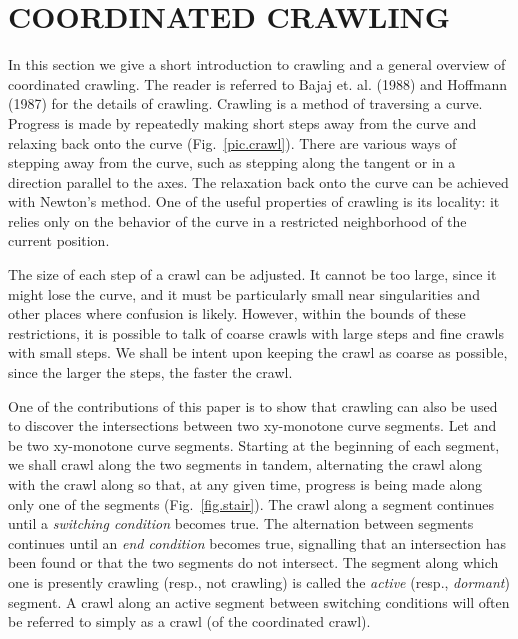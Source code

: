 \section{COORDINATED CRAWLING}
\label{sec-coor}

In this section we give a short introduction to crawling and a general overview
of coordinated crawling.
The reader is referred to Bajaj et. al. (1988) and Hoffmann (1987)
for the details of crawling.
Crawling is a method of traversing a curve.  
Progress is made by repeatedly making short steps away from the curve and
relaxing back onto the curve (Fig.~\ref{pic.crawl}).
There are various ways of stepping away from the curve, such as stepping
along the tangent or in a direction parallel to the axes.
The relaxation back onto the curve can be achieved with Newton's method.
One of the useful properties of crawling is its locality: it relies only on the
behavior of the curve in a restricted neighborhood of the current position.


The size of each step of a crawl can be adjusted.
It cannot be too large, since it might lose the curve, and it must be particularly
small near singularities and other places where confusion is likely.
However, within the bounds of these restrictions, it is possible to talk of 
coarse crawls with large steps and fine crawls with small steps.
We shall be intent upon keeping the crawl as coarse as possible,
since the larger the steps, the faster the crawl.

One of the contributions of this paper is to show that crawling can also be used to 
discover the intersections between two xy-monotone curve segments.
Let  and  be two xy-monotone curve segments.
Starting at the beginning of each segment, we shall crawl along the two segments in 
tandem, alternating the crawl along  with the crawl along  so that,
at any given time, progress is being made along only one of the segments 
(Fig.~\ref{fig.stair}).
The crawl along a segment continues until a {\em switching condition} becomes true.
The alternation between segments continues until an {\em end condition} becomes true, 
signalling that an intersection has been found or that the two segments do not intersect.
The segment along which one is presently crawling (resp., not crawling) is called the 
{\em active} (resp., {\em dormant}) segment.
A crawl along an active segment between switching conditions
will often be referred to simply as a crawl (of the coordinated crawl).

